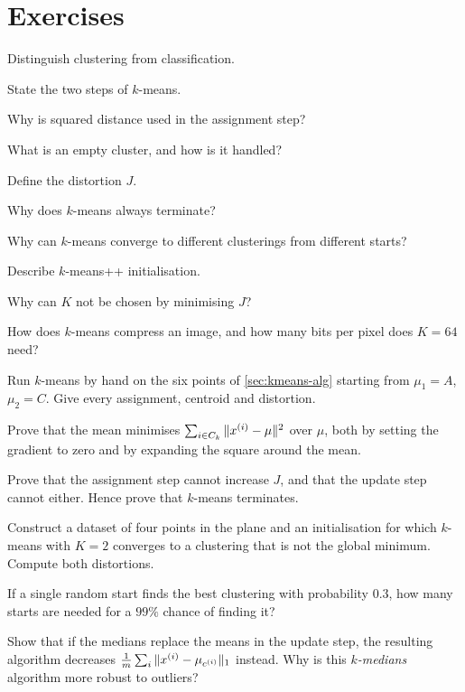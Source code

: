 \section*{Exercises}


\sq Distinguish clustering from classification.

\sq State the two steps of $k$-means.

\sq Why is squared distance used in the assignment step?

\sq What is an empty cluster, and how is it handled?

\sq Define the distortion $J$.

\sq Why does $k$-means always terminate?

\sq Why can $k$-means converge to different clusterings from different starts?

\sq Describe $k$-means++ initialisation.

\sq Why can $K$ not be chosen by minimising $J$?

\sq How does $k$-means compress an image, and how many bits per pixel does
$K = 64$ need?


\ap Run $k$-means by hand on the six points of \cref{sec:kmeans-alg} starting from
$\mu_1 = A$, $\mu_2 = C$. Give every assignment, centroid and distortion.

\ap Prove that the mean minimises $\sum_{i\in C_k}\|x^{(i)} - \mu\|^2$ over $\mu$,
both by setting the gradient to zero and by expanding the square around the mean.

\ap Prove that the assignment step cannot increase $J$, and that the update step
cannot either. Hence prove that $k$-means terminates.

\ap Construct a dataset of four points in the plane and an initialisation for
which $k$-means with $K = 2$ converges to a clustering that is not the global
minimum. Compute both distortions.

\ap If a single random start finds the best clustering with probability $0.3$,
how many starts are needed for a $99\%$ chance of finding it?

\ap Show that if the medians replace the means in the update step, the resulting
algorithm decreases $\frac1m\sum_i\|x^{(i)} - \mu_{c^{(i)}}\|_1$ instead. Why is
this \emph{$k$-medians} algorithm more robust to outliers?

